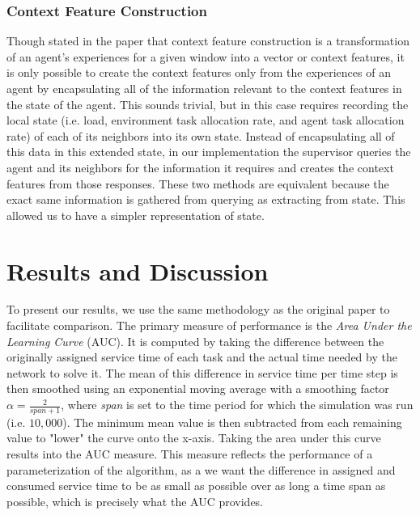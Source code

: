 \documentclass[letterpaper]{article}
\begin{document}
\subsubsection{Context Feature Construction}
Though stated in the paper that context feature construction is a transformation of an agent’s experiences for a given window into a vector or context features, it is only possible to create the context features only from the experiences of an agent by encapsulating all of the information relevant to the context features in the state of the agent. This sounds trivial, but in this case requires recording the local state (i.e. load, environment task allocation rate, and agent task allocation rate) of each of its neighbors into its own state.  Instead of encapsulating all of this data in this extended state, in our implementation the supervisor queries the agent and its neighbors for the information it requires and creates the context features from those responses.  These two methods are equivalent because the exact same information is gathered from querying as extracting from state.  This allowed us to have a simpler representation of state.

\section{Results and Discussion}
To present our results, we use the same methodology as the original paper to facilitate comparison. The primary measure of performance is the \textit{Area Under the Learning Curve} (AUC). It is computed by taking the difference between the originally assigned service time of each task and the actual time needed by the network to solve it. The mean of this difference in service time per time step is then smoothed using an exponential moving average with a smoothing factor $\alpha=\frac{2}{span+1}$, where \textit{span} is set to the time period for which the simulation was run (i.e. $10,000$). The minimum mean value is then subtracted from each remaining value to "lower" the curve onto the x-axis. Taking the area under this curve results into the AUC measure. This measure reflects the performance of a parameterization of the algorithm, as a we want the difference in assigned and consumed service time to be as small as possible over as long a time span as possible, which is precisely what the AUC provides.
\end{document}
